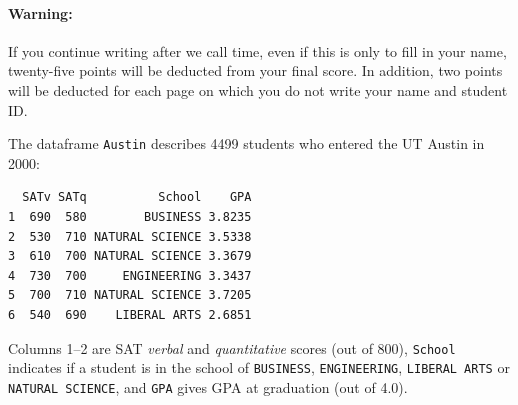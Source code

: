 \documentclass[addpoints,12pt]{exam}
\begin{document}
\paragraph{Warning:} If you continue writing after we call time, even if this is only to fill in your name, twenty-five points will be deducted from your final score. In addition, two points will be deducted for each page on which you do not write your name and student ID. 

\newpage
\begin{questions}

  \question The dataframe \texttt{Austin} describes 4499 students who entered the UT Austin in 2000:
  \small
\begin{verbatim}
  SATv SATq          School    GPA
1  690  580        BUSINESS 3.8235
2  530  710 NATURAL SCIENCE 3.5338
3  610  700 NATURAL SCIENCE 3.3679
4  730  700     ENGINEERING 3.3437
5  700  710 NATURAL SCIENCE 3.7205
6  540  690    LIBERAL ARTS 2.6851
\end{verbatim}
\normalsize
Columns 1--2 are SAT \emph{verbal} and \emph{quantitative} scores (out of 800), \texttt{School} indicates if a student is in the school of \texttt{BUSINESS}, \texttt{ENGINEERING}, \texttt{LIBERAL ARTS} or \texttt{NATURAL SCIENCE}, and \texttt{GPA} gives GPA at graduation (out of 4.0).
\begin{parts}
\vspace{0.2in}

\end{parts}
\end{questions}
\end{document}
